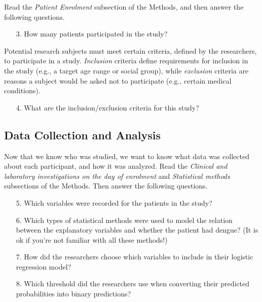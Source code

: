 \documentclass[11pt]{article}
\begin{document}
Read the \textit{Patient Enrolment} subsection of the Methods, and then answer the following questions.

\begin{enumerate}
    \item[3.]  How many patients participated in the study?
\end{enumerate}

\noindent Potential research subjects must meet certain criteria, defined by the researchers, to participate in a study. \textit{Inclusion} criteria define requirements for inclusion in the study (e.g., a target age range or social group), while \textit{exclusion} criteria are reasons a subject would be asked not to participate (e.g., certain medical conditions). 

\begin{enumerate}
    \item[4.] What are the inclusion/exclusion criteria for this study?
\end{enumerate}


\subsection*{Data Collection and Analysis}

Now that we know who was studied, we want to know what data was collected about each participant, and how it was analyzed. Read the \textit{Clinical and laboratory investigations on the day of enrolment} and \textit{Statistical methods} subsections of the Methods. Then answer the following questions.

\begin{enumerate}
\item[5.] Which variables were recorded for the patients in the study?

\item[6.] Which types of statistical methods were used to model the relation between the explanatory variables and whether the patient had dengue? (It is ok if you're not familiar with all these methods!)

\item[7.] How did the researchers choose which variables to include in their logistic regression model?

\item[8.] Which threshold did the researchers use when converting their predicted probabilities into binary predictions?

\end{enumerate}
\end{document}
